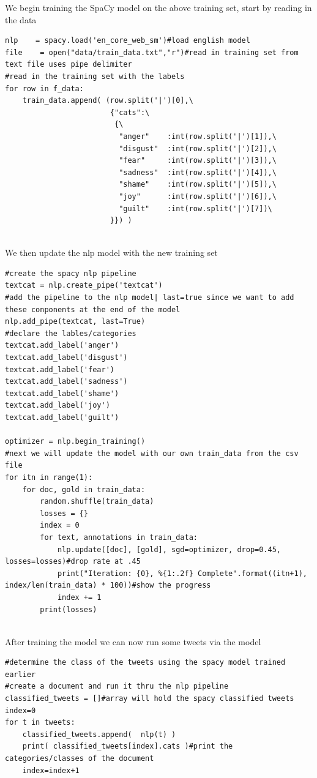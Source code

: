 We begin training the SpaCy model on the above training set,
start by reading in the data 
\begin{lstlisting}
nlp    = spacy.load('en_core_web_sm')#load english model
file    = open("data/train_data.txt","r")#read in training set from text file uses pipe delimiter
#read in the training set with the labels
for row in f_data:
    train_data.append( (row.split('|')[0],\
                        {"cats":\
                         {\
                          "anger"    :int(row.split('|')[1]),\
                          "disgust"  :int(row.split('|')[2]),\
                          "fear"     :int(row.split('|')[3]),\
                          "sadness"  :int(row.split('|')[4]),\
                          "shame"    :int(row.split('|')[5]),\
                          "joy"      :int(row.split('|')[6]),\
                          "guilt"    :int(row.split('|')[7])\
                        }}) )
                        
\end{lstlisting}
\clearpage
We then update the nlp model with the new training set
\begin{lstlisting}
#create the spacy nlp pipeline
textcat = nlp.create_pipe('textcat')
#add the pipeline to the nlp model| last=true since we want to add these conponents at the end of the model
nlp.add_pipe(textcat, last=True)
#declare the lables/categories
textcat.add_label('anger')
textcat.add_label('disgust')
textcat.add_label('fear')
textcat.add_label('sadness')
textcat.add_label('shame')
textcat.add_label('joy')
textcat.add_label('guilt')

optimizer = nlp.begin_training()
#next we will update the model with our own train_data from the csv file
for itn in range(1):
    for doc, gold in train_data:
        random.shuffle(train_data)
        losses = {}
        index = 0
        for text, annotations in train_data:
            nlp.update([doc], [gold], sgd=optimizer, drop=0.45, losses=losses)#drop rate at .45
            print("Iteration: {0}, %{1:.2f} Complete".format((itn+1), index/len(train_data) * 100))#show the progress
            index += 1
        print(losses)
 
\end{lstlisting}


After training the model we can now run some tweets via the model 
\begin{lstlisting}
#determine the class of the tweets using the spacy model trained earlier
#create a document and run it thru the nlp pipeline 
classified_tweets = []#array will hold the spacy classified tweets
index=0
for t in tweets:
    classified_tweets.append(  nlp(t) )
    print( classified_tweets[index].cats )#print the categories/classes of the document
    index=index+1  
\end{lstlisting}


